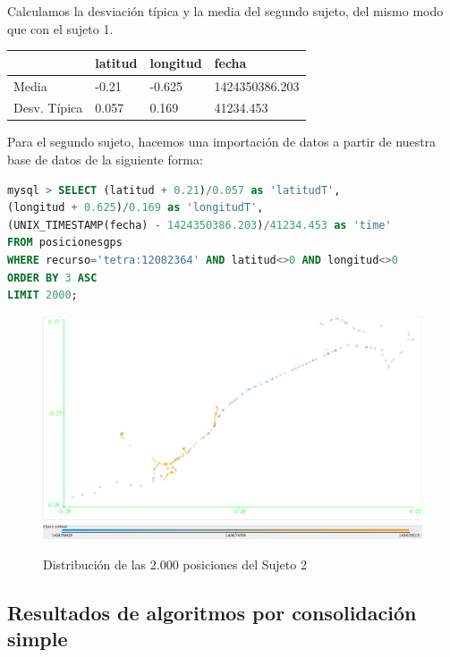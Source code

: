 \documentclass[a4paper, 12pt, spanish]{article}
\begin{document}
Calculamos la desviaci\'on t\'ipica y la media del segundo sujeto, del mismo modo que con el sujeto 1.\\


	\begin{tabular}{|l|l|l|l|}
	\rowcolor{LightCyan}
	\hline
		& latitud & longitud & fecha\\
	\hline
		Media & -0.21 & -0.625 & 1424350386.203 \\
		Desv. T\'ipica & 0.057 & 0.169 & 41234.453 \\
	\hline
	\end{tabular}
	
	\bigskip

Para el segundo sujeto, hacemos una importaci\'on de datos a partir de nuestra base de datos de la siguiente forma:\\

\begin{lstlisting}[language=sql, columns=fullflexible, basicstyle=\small, frame=tblr]
mysql > SELECT (latitud + 0.21)/0.057 as 'latitudT', 
(longitud + 0.625)/0.169 as 'longitudT', 
(UNIX_TIMESTAMP(fecha) - 1424350386.203)/41234.453 as 'time'
FROM posicionesgps
WHERE recurso='tetra:12082364' AND latitud<>0 AND longitud<>0
ORDER BY 3 ASC
LIMIT 2000;
\end{lstlisting}

\begin{figure}[H]
	\includegraphics[scale=.5]{../comparativa/sujeto2.png}
	\includegraphics[scale=.4]{../comparativa/leyenda.png}
	\caption{Distribuci\'on de las 2.000 posiciones del Sujeto 2}
\end{figure}

\subsection{Resultados de algoritmos por consolidaci\'on simple}
\end{document}
